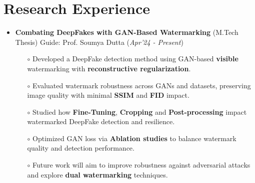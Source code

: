 \documentclass[10.8pt, a4paper]{extarticle}
\newcommand{\shorterSection}[1]{\vspace{-10pt}\section{#1}}
\begin{document}
\vspace{1mm}
\shorterSection{Research Experience}
\vspace{-2pt}
\begin{itemize}
\item \textbf{Combating DeepFakes with GAN-Based Watermarking} (M.Tech Thesis) Guide: Prof.  Soumya Dutta
\hfill(\textit{Apr'24 - Present})


\begin{itemize}
          \item[$\circ$]  Developed a DeepFake detection method using GAN-based \textbf{visible} watermarking with \textbf{reconstructive regularization}.\\[-0.6cm]
          
          \item[$\circ$]  Evaluated watermark robustness across GANs and datasets, preserving image quality with minimal \textbf{SSIM} and \textbf{FID} impact.\\[-0.6cm]
          
          \item[$\circ$] Studied how \textbf{Fine-Tuning}, \textbf{Cropping} and \textbf{Post-processing} impact watermarked DeepFake detection and resilience.\\[-0.6cm]
          
          \item[$\circ$] Optimized GAN loss via \textbf{Ablation studies} to balance watermark quality and detection performance.\\[-0.6cm]

          \item[$\circ$]  Future work will aim to improve robustness against adversarial attacks and explore \textbf{dual watermarking} techniques.\\[-0.6cm]

          
    \end{itemize}
\end{itemize}

\vspace{1.2mm}
\end{document}
